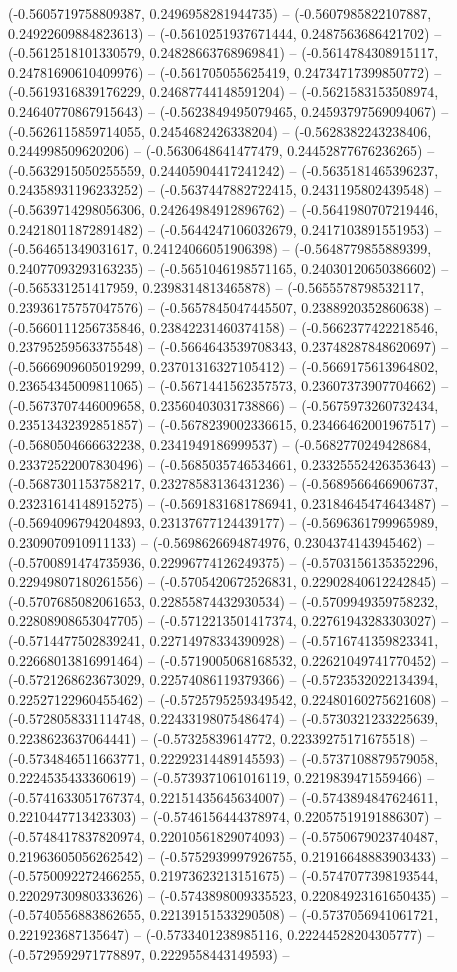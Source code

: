 (-0.5605719758809387, 0.2496958281944735) -- (-0.5607985822107887, 0.24922609884823613) -- (-0.5610251937671444, 0.2487563686421702) -- (-0.5612518101330579, 0.24828663768969841) -- (-0.5614784308915117, 0.24781690610409976) -- (-0.561705055625419, 0.24734717399850772) -- (-0.5619316839176229, 0.24687744148591204) -- (-0.5621583153508974, 0.24640770867915643) -- (-0.5623849495079465, 0.24593797569094067) -- (-0.5626115859714055, 0.2454682426338204) -- (-0.5628382243238406, 0.244998509620206) -- (-0.5630648641477479, 0.24452877676236265) -- (-0.5632915050255559, 0.24405904417241242) -- (-0.5635181465396237, 0.24358931196233252) -- (-0.5637447882722415, 0.2431195802439548) -- (-0.5639714298056306, 0.24264984912896762) -- (-0.5641980707219446, 0.24218011872891482) -- (-0.5644247106032679, 0.2417103891551953) -- (-0.564651349031617, 0.24124066051906398) -- (-0.5648779855889399, 0.24077093293163235) -- (-0.5651046198571165, 0.24030120650386602) -- (-0.565331251417959, 0.2398314813465878) -- (-0.5655578798532117, 0.23936175757047576) -- (-0.5657845047445507, 0.2388920352860638) -- (-0.5660111256735846, 0.23842231460374158) -- (-0.5662377422218546, 0.23795259563375548) -- (-0.5664643539708343, 0.23748287848620697) -- (-0.5666909605019299, 0.23701316327105412) -- (-0.5669175613964802, 0.23654345009811065) -- (-0.5671441562357573, 0.23607373907704662) -- (-0.5673707446009658, 0.23560403031738866) -- (-0.5675973260732434, 0.23513432392851857) -- (-0.5678239002336615, 0.23466462001967517) -- (-0.5680504666632238, 0.2341949186999537) -- (-0.5682770249428684, 0.23372522007830496) -- (-0.5685035746534661, 0.23325552426353643) -- (-0.5687301153758217, 0.23278583136431236) -- (-0.5689566466906737, 0.23231614148915275) -- (-0.5691831681786941, 0.23184645474643487) -- (-0.5694096794204893, 0.23137677124439177) -- (-0.5696361799965989, 0.2309070910911133) -- (-0.5698626694874976, 0.2304374143945462) -- (-0.5700891474735936, 0.22996774126249375) -- (-0.5703156135352296, 0.22949807180261556) -- (-0.5705420672526831, 0.22902840612242845) -- (-0.5707685082061653, 0.22855874432930534) -- (-0.5709949359758232, 0.22808908653047705) -- (-0.5712213501417374, 0.22761943283303027) -- (-0.5714477502839241, 0.22714978334390928) -- (-0.5716741359823341, 0.22668013816991464) -- (-0.5719005068168532, 0.22621049741770452) -- (-0.5721268623673029, 0.22574086119379366) -- (-0.5723532022134394, 0.22527122960455462) -- (-0.5725795259349542, 0.22480160275621608) -- (-0.5728058331114748, 0.22433198075486474) -- (-0.5730321233225639, 0.2238623637064441) -- (-0.57325839614772, 0.22339275171675518) -- (-0.5734846511663771, 0.22292314489145593) -- (-0.5737108879579058, 0.2224535433360619) -- (-0.5739371061016119, 0.2219839471559466) -- (-0.5741633051767374, 0.22151435645634007) -- (-0.5743894847624611, 0.2210447713423303) -- (-0.5746156444378974, 0.22057519191886307) -- (-0.5748417837820974, 0.22010561829074093) -- (-0.5750679023740487, 0.21963605056262542) -- (-0.5752939997926755, 0.21916648883903433) -- (-0.5750092272466255, 0.21973623213151675) -- (-0.5747077398193544, 0.22029730980333626) -- (-0.5743898009335523, 0.22084923161650435) -- (-0.5740556883862655, 0.22139151533290508) -- (-0.5737056941061721, 0.221923687135647) -- (-0.5733401238985116, 0.22244528204305777) -- (-0.5729592971778897, 0.2229558443149593) -- 